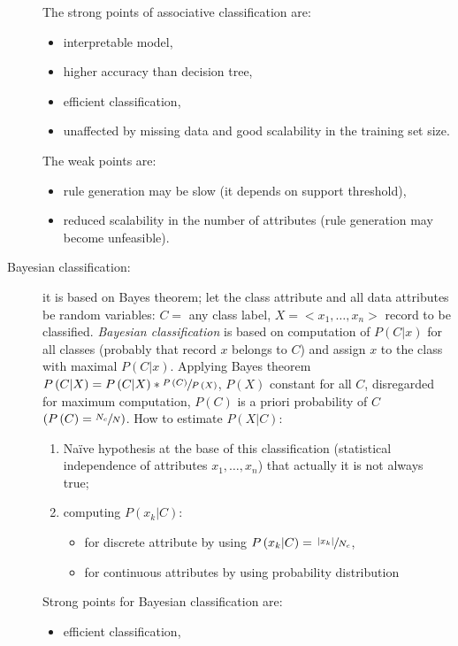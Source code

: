 \begin{description}
	The strong points of associative classification are:
	\begin{itemize}
		\item
		interpretable model,
		\item
		higher accuracy than decision tree,
		\item
		efficient classification,
		\item
		unaffected by missing data and good scalability in the training set size.
	\end{itemize}
	The weak points are:
	\begin{itemize}
		\item
		rule generation may be slow (it depends on support threshold),
		\item
		reduced scalability in the number of attributes (rule generation may become unfeasible).
	\end{itemize}
	\item[Bayesian classification:] it is based on Bayes theorem; let the class attribute and all data attributes be random variables: $C = $ any class label, $X = <x_1, \ldots, x_n>$ record to be classified.
	\emph{Bayesian classification} is based on computation of $P\left(C|x\right)$ for all classes (probably that record $x$ belongs to $C$) and assign $x$ to the class with maximal $P\left(C|x\right)$.
	Applying Bayes theorem $P\left(C|X\right) = P\left(C|X\right) * \sfrac{P\left(C\right)}{P\left(X\right)}$, $P\left(X\right)$ constant for all $C$, disregarded for maximum computation, $P\left(C\right)$ is a priori probability of $C$ $\left(P\left(C\right) = \sfrac{N_c}{N}\right)$.
	How to estimate $P\left(X|C\right)$:
	\begin{enumerate}
		\item
		Na\"{i}ve hypothesis at the base of this classification (statistical independence of attributes $x_1, \ldots, x_n$) that actually it is not always true;
		\item
		computing $P\left(x_k|C\right)$:
		\begin{itemize}
			\item
			for discrete attribute by using $P\left(x_k|C\right) = \sfrac{\left|x_k\right|}{N_c}$,
			\item
			for continuous attributes by using probability distribution
		\end{itemize}
	\end{enumerate}
	Strong points for Bayesian classification are:
	\begin{itemize}
		\item
		efficient classification,

\end{itemize}
\end{description}
